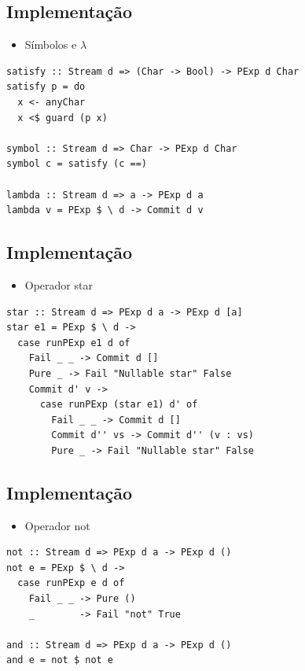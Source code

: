 \documentclass[11pt]{article}
\begin{document}
\subsection*{Implementação}
\label{sec:org5a19b6b}

\begin{itemize}
\item Símbolos e \(\lambda\)
\end{itemize}

\begin{verbatim}
satisfy :: Stream d => (Char -> Bool) -> PExp d Char
satisfy p = do
  x <- anyChar
  x <$ guard (p x)

symbol :: Stream d => Char -> PExp d Char
symbol c = satisfy (c ==)

lambda :: Stream d => a -> PExp d a
lambda v = PExp $ \ d -> Commit d v
\end{verbatim}
\subsection*{Implementação}
\label{sec:org16c132e}

\begin{itemize}
\item Operador star
\end{itemize}

\begin{verbatim}
star :: Stream d => PExp d a -> PExp d [a]
star e1 = PExp $ \ d ->
  case runPExp e1 d of
    Fail _ _ -> Commit d []
    Pure _ -> Fail "Nullable star" False
    Commit d' v ->
      case runPExp (star e1) d' of
        Fail _ _ -> Commit d []
        Commit d'' vs -> Commit d'' (v : vs)
        Pure _ -> Fail "Nullable star" False
\end{verbatim}
\subsection*{Implementação}
\label{sec:orga4b2b5f}

\begin{itemize}
\item Operador not
\end{itemize}

\begin{verbatim}
not :: Stream d => PExp d a -> PExp d ()
not e = PExp $ \ d ->
  case runPExp e d of
    Fail _ _ -> Pure ()
    _        -> Fail "not" True

and :: Stream d => PExp d a -> PExp d ()
and e = not $ not e
\end{verbatim}
\end{document}
